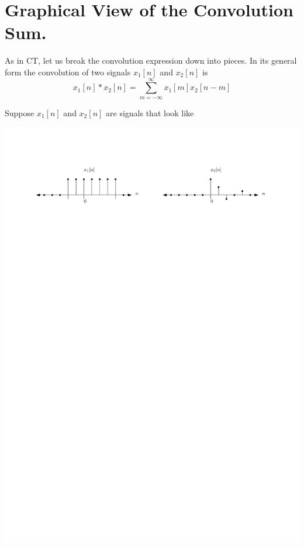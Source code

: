 \section{Graphical View of the Convolution Sum.}

As in CT, let us break the convolution expression down into pieces. In its general form the convolution of two signals $x_1[n]$ and $x_2[n]$ is
\[
x_1[n] * x_2[n] = \sum\limits_{m = -\infty}^{\infty} x_1[m]x_2[n-m]
\]

Suppose $x_1[n]$ and $x_2[n]$ are signals that look like
\begin{center}
  \includegraphics[scale=1]{graphics/dtconvolution-explain1.pdf}
\end{center}

